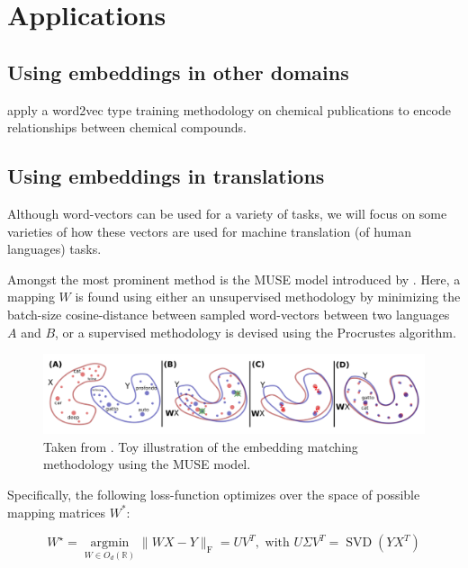 \documentclass[a4paper,12pt,oneside,openright]{report}
\begin{document}
\chapter{Applications}\label{AppendixApplication}

\section{Using embeddings in other domains}

\cite{tshitoyan19} apply a word2vec type training methodology on chemical publications to encode relationships between chemical compounds.


\section{Using embeddings in translations}


Although word-vectors can be used for a variety of tasks, we will focus on some varieties of how these vectors are used for machine translation (of human languages) tasks.

Amongst the most prominent method is the MUSE model introduced by \cite{conneau17}.
Here, a mapping $W$ is found using either an unsupervised methodology by minimizing the batch-size cosine-distance between sampled word-vectors between two languages $A$ and $B$, or a supervised methodology is devised using the Procrustes algorithm.

\begin{figure}[h]
	\center
  \includegraphics[width=\linewidth]{./assets/relatedwork/muse.png}
  \caption{Taken from \cite{conneau17}. Toy illustration of the embedding matching methodology using the MUSE model.}
  \label{fig:muse_translation}
\end{figure}

Specifically, the following loss-function optimizes over the space of possible mapping matrices $W^*$:

\begin{equation}
W^{\star}=\underset{W \in O_{d}(\mathbb{R})}{\operatorname{argmin}}\|W X-Y\|_{\mathrm{F}}=U V^{T}, \text { with } U \Sigma V^{T}=\operatorname{SVD}\left(Y X^{T}\right)
\end{equation}
\end{document}
